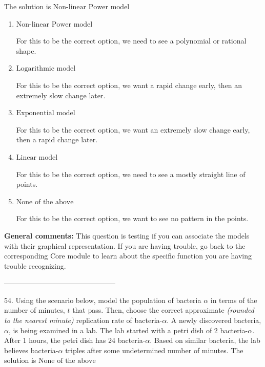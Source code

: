 \documentclass{extbook}[14pt]
\begin{document}
The solution is $ \text{Non-linear Power model} $ 

\begin{enumerate}[label=\Alph*.] 
\item $ \text{Non-linear Power model} $ 

 For this to be the correct option, we need to see a polynomial or rational shape. 
\item $ \text{Logarithmic model} $ 

 For this to be the correct option, we want a rapid change early, then an extremely slow change later. 
\item $ \text{Exponential model} $ 

 For this to be the correct option, we want an extremely slow change early, then a rapid change later. 
\item $ \text{Linear model} $ 

 For this to be the correct option, we need to see a mostly straight line of points. 
\item $ \text{None of the above} $ 

 For this to be the correct option, we want to see no pattern in the points. 
\end{enumerate} 
 
\textbf{General comments:} This question is testing if you can associate the models with their graphical representation. If you are having trouble, go back to the corresponding Core module to learn about the specific function you are having trouble recognizing.

-----------------------------------------------

54. Using the scenario below, model the population of bacteria $\alpha$ in terms of the number of minutes, $t$ that pass. Then, choose the correct approximate \textit{(rounded to the nearest minute)} replication rate of bacteria-$\alpha$.
A newly discovered bacteria, $\alpha$, is being examined in a lab. The lab started with a petri dish of 2 bacteria-$\alpha$. After 1 hours, the petri dish has 24 bacteria-$\alpha$. Based on similar bacteria, the lab believes bacteria-$\alpha$ triples after some undetermined number of minutes. 
The solution is $ \text{None of the above} $ 
\end{document}
